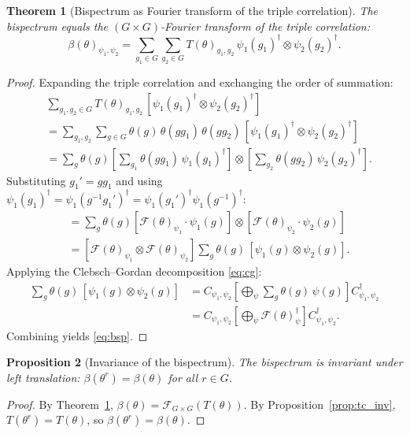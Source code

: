 \documentclass{article}
\newtheorem{theorem}{Theorem}[section]
\newtheorem{proposition}[theorem]{Proposition}
\theoremstyle{definition}
\theoremstyle{remark}
\newcommand{\FF}{\mathcal{F}}
\begin{document}
\begin{theorem}[Bispectrum as Fourier transform of the triple correlation]\label{thm:bsp_is_ft_tc}
The bispectrum equals the $(G \times G)$-Fourier transform of the triple correlation:
\[
\beta(\theta)_{\psi_1, \psi_2}
= \sum_{g_1 \in G} \sum_{g_2 \in G}
T(\theta)_{g_1, g_2}\, \psi_1(g_1)^\dagger \otimes \psi_2(g_2)^\dagger.
\]
\end{theorem}
\begin{proof}
Expanding the triple correlation and exchanging the order of summation:
\begin{align*}
&\sum_{g_1, g_2 \in G} T(\theta)_{g_1,g_2}\, [\psi_1(g_1)^\dagger \otimes \psi_2(g_2)^\dagger] \\
&= \sum_{g_1, g_2} \sum_{g \in G} \theta(g)\, \theta(gg_1)\, \theta(gg_2)\, [\psi_1(g_1)^\dagger \otimes \psi_2(g_2)^\dagger] \\
&= \sum_g \theta(g) \left[\sum_{g_1} \theta(gg_1)\, \psi_1(g_1)^\dagger\right] \otimes \left[\sum_{g_2} \theta(gg_2)\, \psi_2(g_2)^\dagger\right].
\end{align*}
Substituting $g_1' = gg_1$ and using $\psi_1(g_1)^\dagger = \psi_1(g^{-1}g_1')^\dagger = \psi_1(g_1')^\dagger \psi_1(g^{-1})^\dagger$:
\begin{align*}
&= \sum_g \theta(g) \left[\FF(\theta)_{\psi_1} \cdot \psi_1(g)  \right] \otimes \left[\FF(\theta)_{\psi_2} \cdot \psi_2(g) \right] \\
&= [\FF(\theta)_{\psi_1} \otimes \FF(\theta)_{\psi_2}] \sum_g \theta(g)\, [\psi_1(g) \otimes \psi_2(g)].
\end{align*}
Applying the Clebsch--Gordan decomposition \eqref{eq:cg}:
\begin{align*}
\sum_g \theta(g)\, [\psi_1(g) \otimes \psi_2(g)]
&= C_{\psi_1,\psi_2} \left[\bigoplus_{\psi} \sum_g \theta(g)\, \psi(g)\right] C_{\psi_1,\psi_2}^\dagger \\
&= C_{\psi_1,\psi_2} \left[\bigoplus_{\psi} \FF(\theta)_\psi^\dagger\right] C_{\psi_1,\psi_2}^\dagger.
\end{align*}
Combining yields \eqref{eq:bsp}.
\end{proof}

\begin{proposition}[Invariance of the bispectrum]\label{prop:bsp_inv_prelim}
The bispectrum is invariant under left translation: $\beta(\theta^r) = \beta(\theta)$ for all $r \in G$.
\end{proposition}
\begin{proof}
By Theorem~\ref{thm:bsp_is_ft_tc}, $\beta(\theta) = \FF_{G \times G}(T(\theta))$. By Proposition~\ref{prop:tc_inv}, $T(\theta^r) = T(\theta)$, so $\beta(\theta^r) = \beta(\theta)$.
\end{proof}
\end{document}
